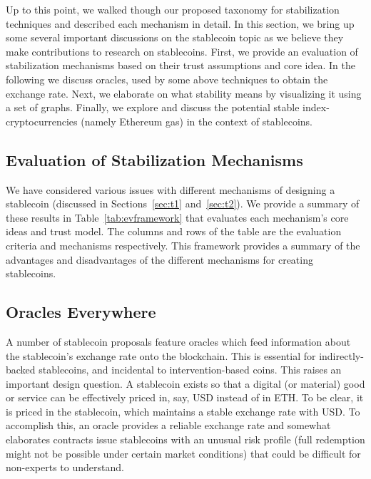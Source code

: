 Up to this point, we walked though our proposed taxonomy for stabilization techniques and described each mechanism in detail. In this section, we bring up some several important discussions on the stablecoin topic as we believe they make contributions to research on stablecoins. First, we provide an evaluation of stabilization mechanisms based on their trust assumptions and core idea. In the following we discuss oracles, used by some above techniques to obtain the exchange rate. Next, we elaborate on what stability means by visualizing it using a set of graphs. Finally, we explore and discuss the potential stable index-cryptocurrencies (namely Ethereum gas) in the context of stablecoins.


\subsection{Evaluation of Stabilization Mechanisms}

We have considered various issues with different mechanisms of designing a stablecoin (discussed in Sections~\ref{sec:t1} and~\ref{sec:t2}). We provide a summary of these results in Table~\ref{tab:evframework} that evaluates each mechanism's core ideas and trust model. The columns and rows of the table are the evaluation criteria and mechanisms respectively. This framework provides a summary of the advantages and disadvantages of the different mechanisms for creating stablecoins.





\subsection{Oracles Everywhere}

A number of stablecoin proposals feature oracles which feed information about the stablecoin's exchange rate onto the blockchain. This is essential for indirectly-backed stablecoins, and incidental to intervention-based coins. This raises an important design question. A stablecoin exists so that a digital (or material) good or service can be effectively priced in, say, USD instead of in ETH. To be clear, it is priced in the stablecoin, which maintains a stable exchange rate with USD. To accomplish this, an oracle provides a reliable exchange rate and somewhat elaborates contracts issue stablecoins with an unusual risk profile (\eg full redemption might not be possible under certain market conditions) that could be difficult for non-experts to understand.

